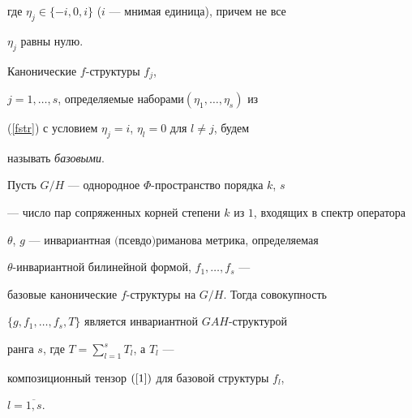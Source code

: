 где $\eta_j\in\{-i,0,i\}$ ($i$ --- мнимая единица), причем не все


$\eta_j$ равны нулю.





\begin{defn}


Канонические $f$-структуры $f_j$,


$j=1,\dotsc,s$, определяемые наборами\linebreak $(\eta_1,\dotsc,\eta_s)$ из


(\ref{fstr}) с условием $\eta_j=i$, $\eta_l=0$ для $l\ne j$, будем


называть {\it базовыми}.


\end{defn}





\begin{thm}\label{T2}


Пусть $G/H$ --- однородное $\Phi$-пространство порядка $k$, $s$


--- число пар сопряженных корней степени $k$ из $1$, входящих в спектр оператора


$\theta$, $g$ --- инвариантная $($псевдо$)$риманова метрика, определяемая


$\theta$-инвариантной билинейной формой, $f_1,\dotsc,f_s$ ---


базовые канонические $f$-структуры на $G/H$. Тогда совокупность


$\{g,f_1,\dotsc,f_s,T\}$ является инвариантной $GAH$-структурой


ранга $s$, где $T=\sum\limits^s_{l=1}T_l$, а $T_l$ ---


композиционный тензор $(\ref{1})$ для базовой структуры $f_l$,


$l=\overline{1,s}$.


\end{thm}





